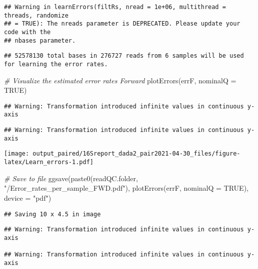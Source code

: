\documentclass[
]{article}
\newenvironment{Shaded}{\begin{snugshade}}{\end{snugshade}}
\newcommand{\AttributeTok}[1]{\textcolor[rgb]{0.77,0.63,0.00}{#1}}
\newcommand{\CommentTok}[1]{\textcolor[rgb]{0.56,0.35,0.01}{\textit{#1}}}
\newcommand{\ConstantTok}[1]{\textcolor[rgb]{0.00,0.00,0.00}{#1}}
\newcommand{\FunctionTok}[1]{\textcolor[rgb]{0.00,0.00,0.00}{#1}}
\newcommand{\NormalTok}[1]{#1}
\newcommand{\StringTok}[1]{\textcolor[rgb]{0.31,0.60,0.02}{#1}}
\begin{document}
\begin{verbatim}
## Warning in learnErrors(filtRs, nread = 1e+06, multithread = threads, randomize
## = TRUE): The nreads parameter is DEPRECATED. Please update your code with the
## nbases parameter.
\end{verbatim}

\begin{verbatim}
## 52578130 total bases in 276727 reads from 6 samples will be used for learning the error rates.
\end{verbatim}

\begin{Shaded}
\begin{Highlighting}[]
\CommentTok{\# Visualize the estimated error rates Forward}
\FunctionTok{plotErrors}\NormalTok{(errF, }\AttributeTok{nominalQ =} \ConstantTok{TRUE}\NormalTok{)}
\end{Highlighting}
\end{Shaded}

\begin{verbatim}
## Warning: Transformation introduced infinite values in continuous y-axis
\end{verbatim}

\begin{verbatim}
## Warning: Transformation introduced infinite values in continuous y-axis
\end{verbatim}

\texttt{[image: output\_paired/16Sreport\_dada2\_pair2021-04-30\_files/figure-latex/Learn\_errors-1.pdf]}

\begin{Shaded}
\begin{Highlighting}[]
\CommentTok{\# Save to file}
\FunctionTok{ggsave}\NormalTok{(}\FunctionTok{paste0}\NormalTok{(readQC.folder, }\StringTok{"/Error\_rates\_per\_sample\_FWD.pdf"}\NormalTok{), }
    \FunctionTok{plotErrors}\NormalTok{(errF, }\AttributeTok{nominalQ =} \ConstantTok{TRUE}\NormalTok{), }\AttributeTok{device =} \StringTok{"pdf"}\NormalTok{)}
\end{Highlighting}
\end{Shaded}

\begin{verbatim}
## Saving 10 x 4.5 in image
\end{verbatim}

\begin{verbatim}
## Warning: Transformation introduced infinite values in continuous y-axis

## Warning: Transformation introduced infinite values in continuous y-axis
\end{verbatim}
\end{document}
